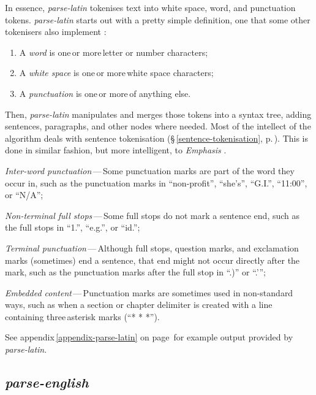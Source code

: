 In essence, \emph{parse-latin} tokenises text into white space, word, and
  punctuation tokens.
\emph{parse-latin} starts out with a pretty simple definition, one that
  some other tokenisers also implement \autocite{treebank-tokenisation}:

\begin{enumerate}
\item A \emph{word} is one\,or more\,letter or number characters;
\item A \emph{white space} is one\,or more\,white space characters;
\item A \emph{punctuation} is one\,or more\,of anything else.
\end{enumerate}

\noindent Then, \emph{parse-latin} manipulates and merges those tokens into a
  syntax tree, adding sentences, paragraphs, and other nodes where needed.
Most of the intellect of the algorithm deals with sentence tokenisation
  (§\,\ref{sentence-tokenisation}, p.\,\pageref{sentence-tokenisation}).
This is done in similar fashion, but more intelligent, to \emph{Emphasis}
  \autocite{nytimes/emphasis-source-code}.

\begin{aenumerate}
\item\emph{Inter-word punctuation}\,---\,Some punctuation marks are part of
  the word they occur in, such as the punctuation marks in ``non-profit'',
  ``she's'', ``G.I.'', ``11:00'', or ``N\slash A'';
\item\emph{Non-terminal full stops}\,---\,Some full stops do not mark a
  sentence end, such as the full stops in ``1.'', ``e.g.'', or ``id.'';
\item\emph{Terminal punctuation}\,---\,Although full stops, question marks,
  and exclamation marks (sometimes) end a sentence, that end might not occur
  directly after the mark, such as the punctuation marks after the full
  stop in ``.)'' or ``.'{}'';
\item\emph{Embedded content}\,---\,Punctuation marks are sometimes used in
  non-standard ways, such as when a section or chapter delimiter is
  created with a line containing three\,asterisk marks (``* * *'').
\end{aenumerate}

\noindent See appendix\,\ref{appendix-parse-latin} on
page\,\pageref{appendix-parse-latin} for example output provided
by \emph{parse-latin}.

\subsection{\emph{parse-english}}\label{parse-english}

